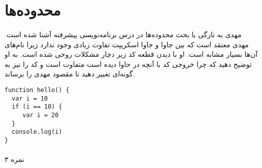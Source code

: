 \documentclass[../main.tex]{subfiles}
\begin{document}
\section{محدوده‌ها}

\paragraph{}
مهدی به تازگی با بحث محدوده‌ها
در درس برنامه‌نویسی پیشرفته آشنا شده است.
مهدی معتقد است که بین جاوا و جاوا اسکریپت تفاوت زیادی وجود ندارد زیرا نام‌های آن‌ها بسیار مشابه است.
او با دیدن قطعه کد زیر دچار مشکلات روحی شده است.
به او توضیح دهید که چرا خروجی کد با آنچه در جاوا دیده است متفاوت است
و کد را نیز به گونه‌ای تغییر دهید تا مقصود مهدی را برساند.

\begin{latin}
\begin{verbatim}
function hello() {
  var i = 10
  if (i == 10) {
     var i = 20
  }
  console.log(i)
}
\end{verbatim}
\end{latin}

\paragraph{}
۳ نمره
\end{document}
